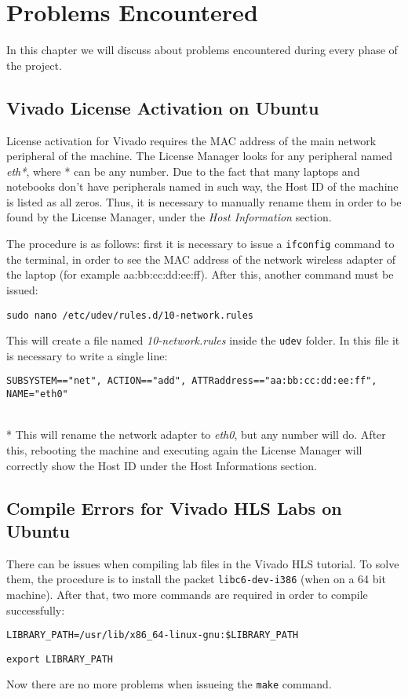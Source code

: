 \chapter{Problems Encountered}
\label{chapter:problems}
In this chapter we will discuss about problems encountered during every phase of the project.

\section{Vivado License Activation on Ubuntu}
\label{vivado_activation}
License activation for Vivado requires the MAC address of the main network peripheral of the machine. The License Manager looks for any peripheral named \textit{eth*}, where * can be any number. Due to the fact that many laptops and notebooks don't have peripherals named in such way, the Host ID of the machine is listed as all zeros. Thus, it is necessary to manually rename them in order to be found by the License Manager, under the \textit{Host Information} section.

The procedure is as follows: first it is necessary to issue a \texttt{ifconfig} command to the terminal, in order to see the MAC address of the network wireless adapter of the laptop (for example aa:bb:cc:dd:ee:ff). After this, another command must be issued:

\texttt{sudo nano /etc/udev/rules.d/10-network.rules}

This will create a file named \textit{10-network.rules} inside the \texttt{udev} folder. In this file it is necessary to write a single line:

\begin{scriptsize}
\texttt{SUBSYSTEM=="net", ACTION=="add", ATTR{address}=="aa:bb:cc:dd:ee:ff", NAME="eth0"}
\end{scriptsize}
\\*
This will rename the network adapter to \textit{eth0}, but any number will do. After this, rebooting the machine and executing again the License Manager will correctly show the Host ID under the Host Informations section.

\section{Compile Errors for Vivado HLS Labs on Ubuntu}
\label{vivado_compile}
There can be issues when compiling lab files in the Vivado HLS tutorial. To solve them, the procedure is to install the packet \texttt{libc6-dev-i386} (when on a 64 bit machine). After that, two more commands are required in order to compile successfully:

\texttt{LIBRARY\_PATH=/usr/lib/x86\_64-linux-gnu:\$LIBRARY\_PATH}

\texttt{export LIBRARY\_PATH}

Now there are no more problems when issueing the \texttt{make} command.